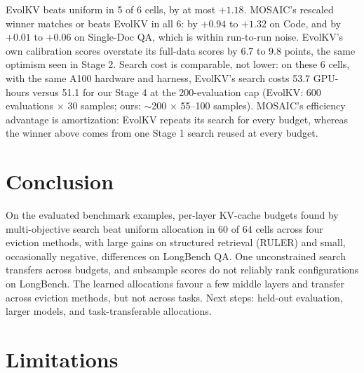 \documentclass[11pt]{article}
\begin{document}
EvolKV beats uniform in 5 of 6 cells, by at most $+1.18$. MOSAIC's rescaled winner matches or beats EvolKV in all 6: by $+0.94$ to $+1.32$ on Code, and by $+0.01$ to $+0.06$ on Single-Doc QA, which is within run-to-run noise. EvolKV's own calibration scores overstate its full-data scores by 6.7 to 9.8 points, the same optimism seen in Stage 2. Search cost is comparable, not lower: on these 6 cells, with the same A100 hardware and harness, EvolKV's search costs 53.7 GPU-hours versus 51.1 for our Stage 4 at the 200-evaluation cap (EvolKV: 600 evaluations $\times$ 30 samples; ours: $\sim$200 $\times$ 55--100 samples). MOSAIC's efficiency advantage is amortization: EvolKV repeats its search for every budget, whereas the winner above comes from one Stage 1 search reused at every budget.

\section{Conclusion}

On the evaluated benchmark examples, per-layer KV-cache budgets found by multi-objective search beat uniform allocation in 60 of 64 cells across four eviction methods, with large gains on structured retrieval (RULER) and small, occasionally negative, differences on LongBench QA. One unconstrained search transfers across budgets, and subsample scores do not reliably rank configurations on LongBench. The learned allocations favour a few middle layers and transfer across eviction methods, but not across tasks. Next steps: held-out evaluation, larger models, and task-transferable allocations.

\section*{Limitations}
\end{document}
